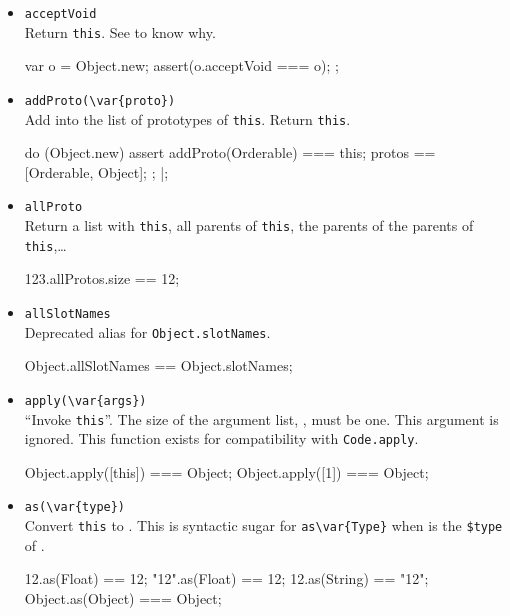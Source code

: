 \begin{itemize}
\item \lstinline|acceptVoid|\\
  Return \lstinline|this|.  See  to know why.
\begin{urbiscript}
{
  var o = Object.new;
  assert(o.acceptVoid === o);
};
\end{urbiscript}


\item \lstinline|addProto(\var{proto})|\\
  Add  into the list of prototypes of \lstinline|this|.
  Return \lstinline|this|.
\begin{urbiscript}
do (Object.new)
{
  assert
  {
    addProto(Orderable) === this;
    protos == [Orderable, Object];
  };
}|;
\end{urbiscript}

\item \lstinline|allProto|\\
  Return a list with \lstinline|this|, all parents of
  \lstinline|this|, the parents of the parents of
  \lstinline|this|,\ldots
\begin{urbiassert}
123.allProtos.size == 12;
\end{urbiassert}

\item \lstinline|allSlotNames|\\
  Deprecated alias for \lstinline|Object.slotNames|.
\begin{urbiassert}
Object.allSlotNames == Object.slotNames;
\end{urbiassert}

\item \lstinline|apply(\var{args})|\\
  ``Invoke \lstinline|this|''.  The size of the argument list,
  , must be one.  This argument is ignored.  This function
  exists for compatibility with \lstinline|Code.apply|.
\begin{urbiassert}
Object.apply([this]) === Object;
Object.apply([1])    === Object;
\end{urbiassert}

\item \lstinline|as(\var{type})|\\
  Convert \lstinline|this| to .  This is syntactic sugar for
  \lstinline|as\var{Type}| when  is the \lstinline|$type| of
  .
\begin{urbiassert}
12.as(Float) == 12;
"12".as(Float) == 12;
12.as(String) == "12";
Object.as(Object) === Object;
\end{urbiassert}


\end{itemize}
